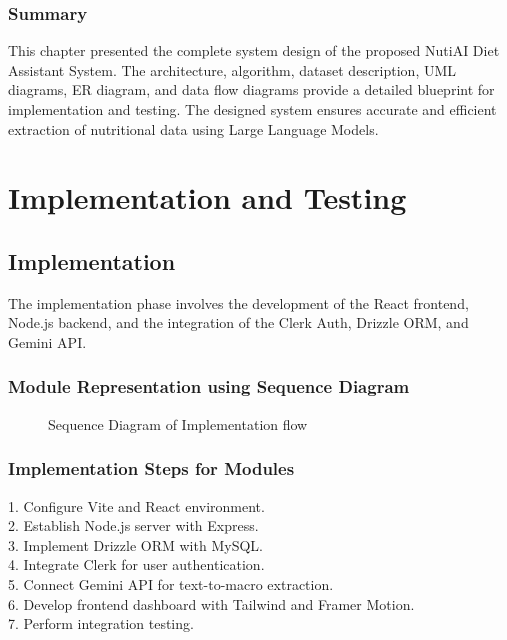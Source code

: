 \documentclass[12pt,a4paper]{report}
\begin{document}
\subsection{Summary}
This chapter presented the complete system design of the proposed NutiAI Diet Assistant System. The architecture, algorithm, dataset description, UML diagrams, ER diagram, and data flow diagrams provide a detailed blueprint for implementation and testing. The designed system ensures accurate and efficient extraction of nutritional data using Large Language Models.


\chapter{Implementation and Testing}

\section{Implementation}
The implementation phase involves the development of the React frontend, Node.js backend, and the integration of the Clerk Auth, Drizzle ORM, and Gemini API.

\subsection{Module Representation using Sequence Diagram}
\begin{figure}[H]
    \centering
    \fbox{\rule{0pt}{1.5in} \rule{0.6\textwidth}{0pt}}
    \caption{Sequence Diagram of Implementation flow}
\end{figure}

\subsection{Implementation Steps for Modules}
1. Configure Vite and React environment.\\
2. Establish Node.js server with Express.\\
3. Implement Drizzle ORM with MySQL.\\
4. Integrate Clerk for user authentication.\\
5. Connect Gemini API for text-to-macro extraction.\\
6. Develop frontend dashboard with Tailwind and Framer Motion.\\
7. Perform integration testing.
\end{document}
